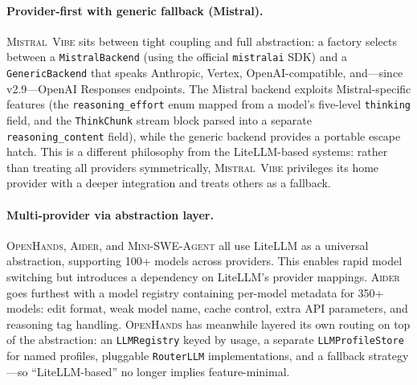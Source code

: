 \documentclass[11pt,a4paper]{article}
\newcommand{\oh}{\textsc{OpenHands}\xspace}
\newcommand{\adr}{\textsc{Aider}\xspace}
\newcommand{\mswe}{\textsc{Mini-SWE-Agent}\xspace}
\newcommand{\vibe}{\textsc{Mistral~Vibe}\xspace}
\begin{document}
\paragraph{Provider-first with generic fallback (Mistral).}
\vibe{} sits between tight coupling and full abstraction: a factory selects between a \texttt{MistralBackend} (using the official \texttt{mistralai} SDK) and a \texttt{GenericBackend} that speaks Anthropic, Vertex, OpenAI-compatible, and---since v2.9---OpenAI Responses endpoints.
The Mistral backend exploits Mistral-specific features (the \texttt{reasoning\_effort} enum mapped from a model's five-level \texttt{thinking} field, and the \texttt{ThinkChunk} stream block parsed into a separate \texttt{reasoning\_content} field), while the generic backend provides a portable escape hatch.
This is a different philosophy from the LiteLLM-based systems: rather than treating all providers symmetrically, \vibe{} privileges its home provider with a deeper integration and treats others as a fallback.

\paragraph{Multi-provider via abstraction layer.}
\oh{}, \adr{}, and \mswe{} all use LiteLLM as a universal abstraction, supporting 100+ models across providers.
This enables rapid model switching but introduces a dependency on LiteLLM's provider mappings.
\adr{} goes furthest with a model registry containing per-model metadata for 350+ models: edit format, weak model name, cache control, extra API parameters, and reasoning tag handling.
\oh{} has meanwhile layered its own routing on top of the abstraction: an \texttt{LLMRegistry} keyed by usage, a separate \texttt{LLMProfileStore} for named profiles, pluggable \texttt{RouterLLM} implementations, and a fallback strategy---so ``LiteLLM-based'' no longer implies feature-minimal.
\end{document}
